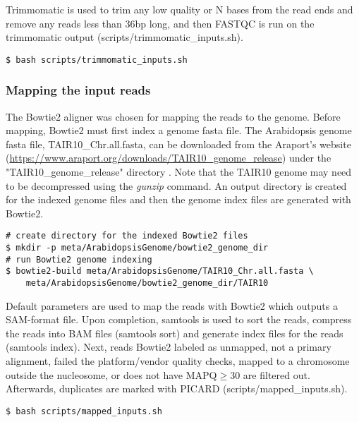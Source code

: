 \documentclass{article}
\begin{document}
\begin{sloppypar}
Trimmomatic is used to trim any low quality or N bases from the read ends and remove any reads less than 36bp long, and then FASTQC is run on the trimmomatic output ({\selectfont scripts/trimmomatic\_inputs.sh}). 

\begin{verbatim}
$ bash scripts/trimmomatic_inputs.sh
\end{verbatim}

\subsubsection{Mapping the input reads}

The Bowtie2 aligner was chosen for mapping the reads to the genome. Before mapping, Bowtie2 must first index a  genome fasta file. The Arabidopsis genome fasta file, TAIR10\_Chr.all.fasta, can be downloaded from the Araport's website (\url{https://www.araport.org/downloads/TAIR10_genome_release}) under the "TAIR10\_genome\_release" directory \cite{Araport11}. Note that the TAIR10 genome may need to be decompressed  using the \emph{gunzip} command. An output directory is created for the indexed genome files and then the genome index files are generated with Bowtie2.

\begin{verbatim}
# create directory for the indexed Bowtie2 files
$ mkdir -p meta/ArabidopsisGenome/bowtie2_genome_dir
# run Bowtie2 genome indexing
$ bowtie2-build meta/ArabidopsisGenome/TAIR10_Chr.all.fasta \
    meta/ArabidopsisGenome/bowtie2_genome_dir/TAIR10
\end{verbatim}

Default parameters are used to map the reads with Bowtie2 which outputs a SAM-format file. Upon completion, samtools is used to sort the reads, compress the reads into BAM files (samtools sort) and generate index files for the reads (samtools index).  Next, reads Bowtie2 labeled as unmapped, not a primary alignment, failed the platform/vendor quality checks, mapped to a chromosome outside the nucleosome, or does not have MAPQ$\geq$30 are filtered out. Afterwards, duplicates are marked with PICARD  ({\selectfont scripts/mapped\_inputs.sh}).

\begin{verbatim}
$ bash scripts/mapped_inputs.sh
\end{verbatim}


\end{sloppypar}
\end{document}
